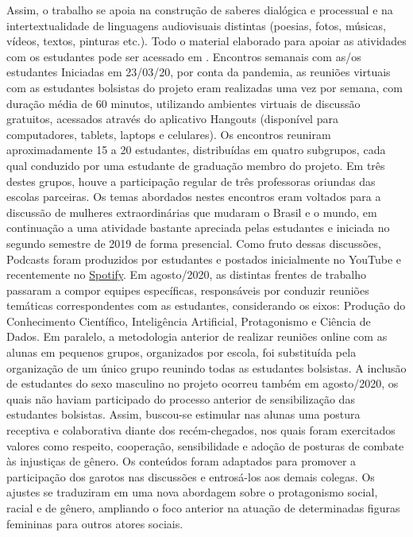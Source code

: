 \documentclass[
]{book}
\begin{document}
Assim, o trabalho se apoia na construção de saberes dialógica e processual e na intertextualidade de linguagens audiovisuais distintas (poesias, fotos, músicas, vídeos, textos, pinturas etc.).
Todo o material elaborado para apoiar as atividades com os estudantes pode ser acessado em \href{https://cienciadedadosep.wixsite.com/estudantes}{}.
Encontros semanais com as/os estudantes
Iniciadas em 23/03/20, por conta da pandemia, as reuniões virtuais com as estudantes bolsistas do projeto eram realizadas uma vez por semana, com duração média de 60 minutos, utilizando ambientes virtuais de discussão gratuitos, acessados através do aplicativo Hangouts (disponível para computadores, tablets, laptops e celulares). Os encontros reuniram aproximadamente 15 a 20 estudantes, distribuídas em quatro subgrupos, cada qual conduzido por uma estudante de graduação membro do projeto. Em três destes grupos, houve a participação regular de três professoras oriundas das escolas parceiras. Os temas abordados nestes encontros eram voltados para a discussão de mulheres extraordinárias que mudaram o Brasil e o mundo, em continuação a uma atividade bastante apreciada pelas estudantes e iniciada no segundo semestre de 2019 de forma presencial. Como fruto dessas discussões, Podcasts foram produzidos por estudantes e postados inicialmente no YouTube e recentemente no \href{https://open.spotify.com/show/4hHoJYZVxVPOYrAT2OGuB8}{Spotify}.
Em agosto/2020, as distintas frentes de trabalho passaram a compor equipes específicas, responsáveis por conduzir reuniões temáticas correspondentes com as estudantes, considerando os eixos: Produção do Conhecimento Científico, Inteligência Artificial, Protagonismo e Ciência de Dados. Em paralelo, a metodologia anterior de realizar reuniões online com as alunas em pequenos grupos, organizados por escola, foi substituída pela organização de um único grupo reunindo todas as estudantes bolsistas.
A inclusão de estudantes do sexo masculino no projeto ocorreu também em agosto/2020, os quais não haviam participado do processo anterior de sensibilização das estudantes bolsistas. Assim, buscou-se estimular nas alunas uma postura receptiva e colaborativa diante dos recém-chegados, nos quais foram exercitados valores como respeito, cooperação, sensibilidade e adoção de posturas de combate às injustiças de gênero. Os conteúdos foram adaptados para promover a participação dos garotos nas discussões e entrosá-los aos demais colegas. Os ajustes se traduziram em uma nova abordagem sobre o protagonismo social, racial e de gênero, ampliando o foco anterior na atuação de determinadas figuras femininas para outros atores sociais.
\end{document}
